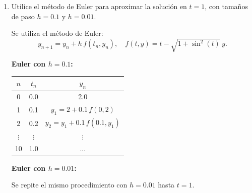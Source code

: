 \begin{enumerate}
\begin{respuesta}[title=Punto 2 — Aproximación Numérica]
\begin{verbatim}
        def mu(t):
            return math.exp(simpson(f, 0, t, 100))

        ts = [i/10 for i in range(1, 11)]
        mu_vals = [mu(t) for t in ts]

        print("t | mu(t)")
        for t, m in zip(ts, mu_vals):
            print(f"{t:.1f} | {m:.6f}")

        def g_index(i):
            return ts[i] * mu_vals[i]

        h = 0.1
        S = g_index(0) + g_index(9)
        for i in range(1, 9):
            S += 4*g_index(i) if i % 2 else 2*g_index(i)

        I = S * h / 3
        y1 = I / mu_vals[-1] + 2 / mu_vals[-1]

        print("\nIntegral ~", I)
        print("y(1) ~", y1)

        \end{verbatim}

        \end{respuesta}
    \item Utilice el método de Euler para aproximar la solución en $t=1$, con tamaños de
    paso $h=0.1$ y $h=0.01$.
        \begin{respuesta}[title=Punto 3 — Método de Euler]

        Se utiliza el método de Euler:
        \[
        y_{n+1} = y_n + h\,f(t_n,y_n),
        \quad f(t,y)=t-\sqrt{1+\sin^2(t)}\,y.
        \]

        \textbf{Euler con $h = 0.1$:}

        \begin{center}
        \begin{tabular}{ccc}
        \toprule
        $n$ & $t_n$ & $y_n$ \\
        \midrule
        0 & 0.0 & 2.0 \\
        1 & 0.1 & $y_1 = 2 + 0.1\,f(0,2)$ \\
        2 & 0.2 & $y_2 = y_1 + 0.1\,f(0.1,y_1)$ \\
        $\vdots$ & $\vdots$ & $\vdots$ \\
        10 & 1.0 & ... \\
        \bottomrule
        \end{tabular}
        \end{center}

        \textbf{Euler con $h = 0.01$:}

        Se repite el mismo procedimiento con $h=0.01$ hasta $t=1$.


\end{respuesta}
\end{enumerate}

